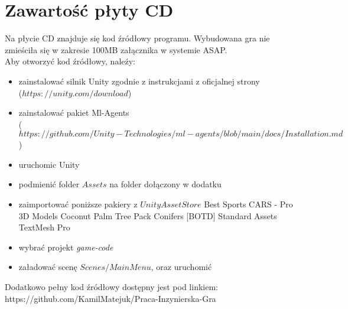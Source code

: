 \chapter{Zawartość płyty CD}
\thispagestyle{chapterBeginStyle}
\label{plytaCD}

Na płycie CD znajduje się kod źródłowy programu.
Wybudowana gra nie zmieściła się w zakresie 100MB załącznika w systemie ASAP.\\%
Aby otworzyć kod źródłowy, naleźy:
\begin{itemize}
    \item zainstalować silnik Unity zgodnie z instrukcjami z oficjalnej strony\\($https://unity.com/download$)
    \item zainstalować pakiet Ml-Agents\\($https://github.com/Unity-Technologies/ml-agents/blob/main/docs/Installation.md$)
    \item uruchomic Unity
    \item podmienić folder $Assets$ na folder dołączony w dodatku
    \item zaimportować poniższe pakiery z $UnityAssetStore$
        \subitem Best Sports CARS - Pro 3D Models
        \subitem Coconut Palm Tree Pack
        \subitem Conifers [BOTD]
        \subitem Standard Assets
        \subitem TextMesh Pro
    \item wybrać projekt \textit{game-code}
    \item załadować scenę $Scenes/MainMenu$, oraz uruchomić
\end{itemize}

Dodatkowo pełny kod źródłowy dostępny jest pod linkiem:\\
https://github.com/KamilMatejuk/Praca-Inzynierska-Gra


